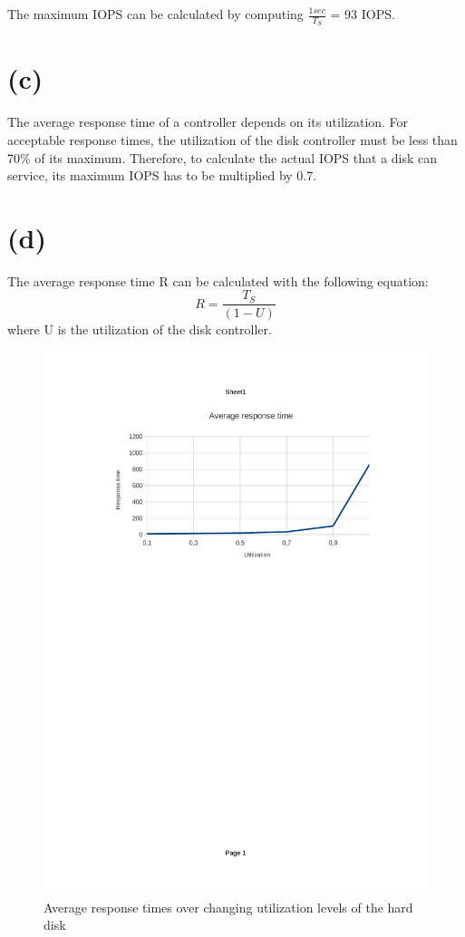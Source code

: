 \documentclass{article}
\begin{document}
The maximum IOPS can be calculated by computing $\frac{1sec}{T_S}$ = 93 IOPS.

\section*{(c)}
The average response time of a controller depends on its utilization. For acceptable response times, the utilization of the disk controller must be less than 70\% of its maximum. Therefore, to calculate the actual IOPS that a disk can service, its maximum IOPS has to be multiplied by 0.7.

\section*{(d)}
The average response time R can be calculated with the following equation:
\begin{equation}
R = \frac{T_S}{(1-U)}
\end{equation}
where U is the utilization of the disk controller.

\begin{figure}
	\begin{center}
	\includegraphics[width=\textwidth]{plot.pdf}
	\caption{Average response times over changing utilization levels of the hard disk}
	\label{fig:responsetime}
	\end{center}
\end{figure}
\end{document}
